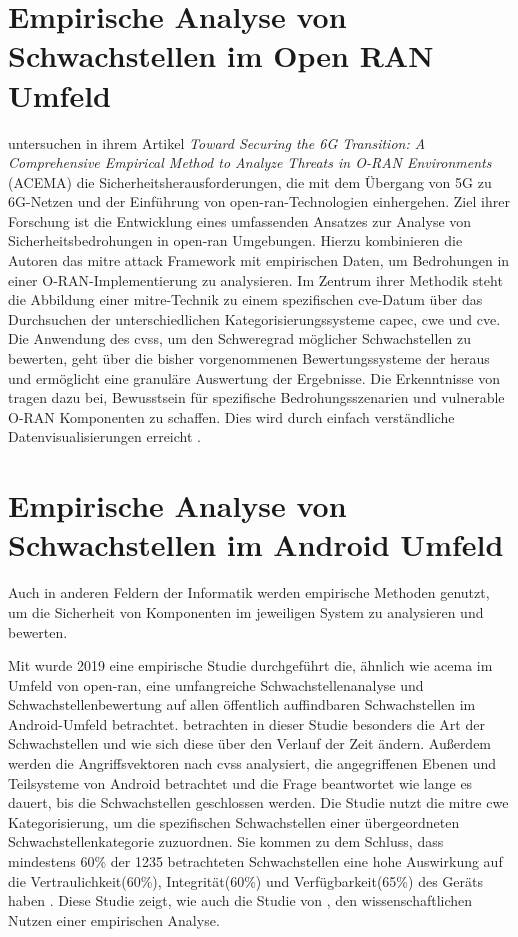 \section{Empirische Analyse von Schwachstellen im Open RAN Umfeld}
\label{sec:forschungsstand-acema}
\citeauthor{klementSecuring6GTransition2024} untersuchen in ihrem Artikel \textit{Toward Securing the 6G Transition: A Comprehensive Empirical Method to Analyze Threats in O-RAN Environments} (ACEMA) die Sicherheitsherausforderungen, die mit dem Übergang von 5G zu 6G-Netzen und der Einführung von \gls{open-ran}-Technologien einhergehen. Ziel ihrer Forschung ist die Entwicklung eines umfassenden Ansatzes zur Analyse von Sicherheitsbedrohungen in \gls{open-ran} Umgebungen. Hierzu kombinieren die Autoren das \gls{mitre} \gls{attack} Framework mit empirischen Daten, um Bedrohungen in einer O-RAN-Implementierung zu analysieren. Im Zentrum ihrer Methodik steht die Abbildung einer \gls{mitre}-Technik zu einem spezifischen \gls{cve}-Datum über das Durchsuchen der unterschiedlichen Kategorisierungssysteme \gls{capec}, \gls{cwe} und \gls{cve}. Die Anwendung des \gls{cvss}, um den Schweregrad möglicher Schwachstellen zu bewerten, geht über die bisher vorgenommenen Bewertungssysteme der \orana{} heraus und ermöglicht eine granuläre Auswertung der Ergebnisse. Die Erkenntnisse von \citeauthor{klementSecuring6GTransition2024} tragen dazu bei, Bewusstsein für spezifische Bedrohungsszenarien und vulnerable O-RAN Komponenten zu schaffen. Dies wird durch einfach verständliche Datenvisualisierungen erreicht \autocite{klementSecuring6GTransition2024}.

%
\section{Empirische Analyse von Schwachstellen im Android Umfeld}
\label{sec:forschungsstand-android}
Auch in anderen Feldern der Informatik werden empirische Methoden genutzt, um die Sicherheit von Komponenten im jeweiligen System zu analysieren und bewerten.
\par Mit  wurde 2019 eine empirische Studie durchgeführt die, ähnlich wie \gls{acema} im Umfeld von \gls{open-ran}, eine umfangreiche Schwachstellenanalyse und Schwachstellenbewertung auf allen öffentlich auffindbaren Schwachstellen im Android-Umfeld betrachtet. \citeauthor{mazuera-rozoAndroidOSStack2019} betrachten in dieser Studie besonders die Art der Schwachstellen und wie sich diese über den Verlauf der Zeit ändern. Außerdem werden die Angriffsvektoren nach \gls{cvss} analysiert, die angegriffenen Ebenen und Teilsysteme von Android betrachtet und die Frage beantwortet wie lange es dauert, bis die Schwachstellen geschlossen werden. Die Studie nutzt die \gls{mitre} \gls{cwe} Kategorisierung, um die spezifischen Schwachstellen einer übergeordneten Schwachstellenkategorie zuzuordnen. Sie kommen zu dem Schluss, dass mindestens 60\% der 1235 betrachteten Schwachstellen eine hohe Auswirkung auf die Vertraulichkeit(60\%), Integrität(60\%) und Verfügbarkeit(65\%) des Geräts haben \autocite{mazuera-rozoAndroidOSStack2019}. Diese Studie zeigt, wie auch die Studie von \citeauthor{klementSecuring6GTransition2024}, den wissenschaftlichen Nutzen einer empirischen Analyse.